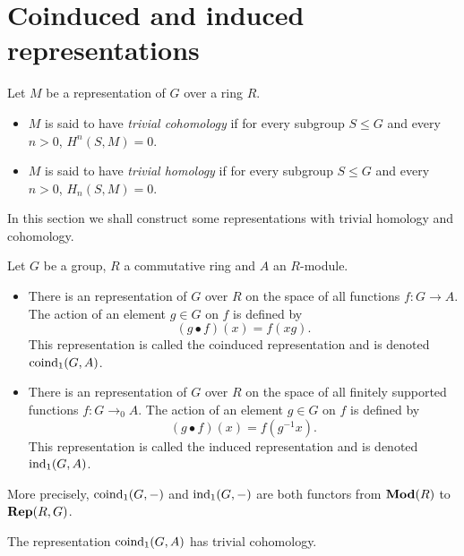 \section{Coinduced and induced representations}


\begin{definition}\label{def:trivial cohomology}
	\leanok
	Let $M$ be a representation of $G$ over a ring $R$.
	\begin{itemize}
		\item
		$M$ is said to have \emph{trivial cohomology} if for every subgroup $S \le G$
		and every $n > 0$, $H^n(S,M) = 0$.
		\item
		$M$ is said to have \emph{trivial homology} if for every subgroup $S \le G$
		and every $n > 0$, $H_n(S,M) = 0$.
	\end{itemize}
\end{definition}

In this section we shall construct some representations with trivial homology and cohomology.

\begin{definition}\label{def:induced}
	\leanok
	Let $G$ be a group, $R$ a commutative ring and $A$ an $R$-module.
	\begin{itemize}
		\item
		There is an representation of $G$ over $R$
		on the space of all functions $f : G \to A$. The action of an element $g \in G$ on $f$
		is defined by
		\[
			(g \bullet f) (x) = f(xg).
		\]
		This representation is called the coinduced representation and is denoted $\mathrm{coind}_1(G,A)$.
		\item
		There is an representation of $G$ over $R$
		on the space of all finitely supported functions $f : G \to_0 A$.
		The action of an element $g \in G$ on $f$ is defined by
		\[
			(g \bullet f) (x) = f(g^{-1}x).
		\]
		This representation is called the induced representation and is denoted $\mathrm{ind}_1(G,A)$.
	\end{itemize}
	More precisely, $\mathrm{coind}_1(G,-)$ and $\mathrm{ind}_1(G,-)$ are both functors from $\mathbf{Mod}(R)$ to $\mathbf{Rep}(R,G)$.
\end{definition}

\begin{lemma}	\label{lem:coind₁ trivial cohomology}
	\leanok
	The representation $\mathrm{coind}_1(G,A)$ has trivial cohomology.
\end{lemma}

